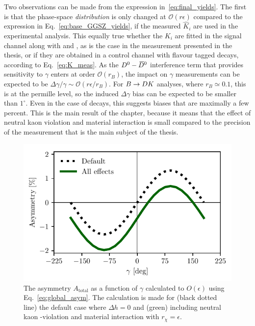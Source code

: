  
Two observations can be made from the expression in~\eqref{eq:final_yields}. The first is that the phase-space \emph{distribution} is only changed at $\mathcal O(r\epsilon)$ compared to the expression in Eq.~\eqref{eq:base_GGSZ_yields}, if the measured $\hat K_i$ are used in the experimental analysis. This equally true whether the $K_i$ are fitted in the signal channel along with \xpm and \ypm, as is the case in the measurement presented in the thesis, or if they are obtained in a control channel with flavour tagged \D decays, according to Eq.~\eqref{eq:K_meas}. As the ${{D}^0}-{{\kern 0.18em\overline{\kern -0.18em D}}{}^0}$ interference term that provides sensitivity to $\gamma$ enters at order $\mathcal O(r_B)$, the impact on $\gamma$ measurements can be expected to be $\Delta\gamma/\gamma\sim \mathcal O(r\epsilon/r_B)$. For ${B}\rightarrow{\ensuremath{D}} K$ analyses, where $r_B\simeq0.1$, this is at the permille level, so the induced $\Delta\gamma$ bias can be expected to be smaller than $1^\circ$. Even in the case of \BtoDpi decays, this suggests biases that are maximally a few percent. This is the main result of the chapter, because it means that the effect of neutral kaon \CP violation and material interaction is small compared to the precision of the measurement that is the main subject of the thesis.

\begin{figure}[tb]
    \centering{}
    \includegraphics{figures/ks_chapter/paper_asym_for_gammas.pdf}
    \caption{The asymmetry $A_\text{total}$ as a function of $\gamma$ calculated to $O(\epsilon)$ using Eq.~\eqref{eq:global_asym}. The calculation is made for (black dotted line) the default case where $\Delta h = 0$ and (green) including neutral kaon \CP-violation and material interaction with $r_\chi=\epsilon$.}
    \label{fig:global_asym}
\end{figure}

